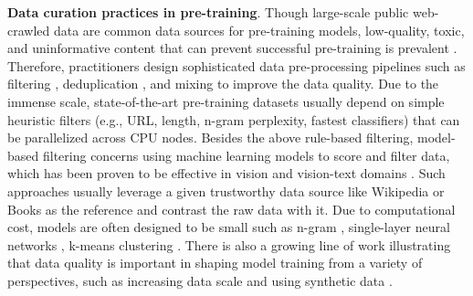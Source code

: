 \documentclass{article}
\begin{document}
\textbf{Data curation practices in pre-training}.
Though large-scale public web-crawled data are common data sources for pre-training models, low-quality, toxic, and uninformative content that can prevent successful pre-training is prevalent \citep{wenzek2020ccnet, elazar2023s, sorscher2022beyond, allenzhu2024physics}. 
Therefore, practitioners design sophisticated data pre-processing pipelines such as filtering \citep{brown2020language}, deduplication \citep{lee2022deduplicating}, and mixing \citep{touvron2023llama, touvron2023llama2} to improve the data quality.
Due to the immense scale, state-of-the-art pre-training datasets usually depend on simple heuristic filters \citep{raffel2020exploring, rae2021scaling, together2023redpajama} (e.g., URL, length, n-gram perplexity, fastest classifiers) that can be parallelized across CPU nodes.
Besides the above rule-based filtering, model-based filtering concerns using machine learning models to score and filter data, which has been proven to be effective in vision and vision-text domains \citep{schuhmann2022laion, abbas2023semdedup, fang2023data}.
Such approaches usually leverage a given trustworthy data source like Wikipedia or Books as the reference and contrast the raw data with it. 
Due to computational cost, models are often designed to be small such as n-gram \citep{xie2023data}, single-layer neural networks \citep{joulin2017bag, brown2020language}, k-means clustering \citep{tirumala2024d4}.
There is also a growing line of work illustrating that data quality is important in shaping model training from a variety of perspectives, such as increasing data scale \citep{hoffmann2022training, meta2023llama3} and using synthetic data \citep{gunasekar2023textbooks}.  




\end{document}
